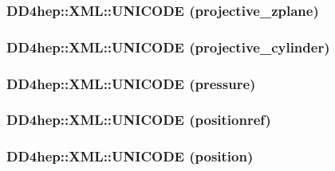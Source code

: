 \label{namespace_d_d4hep_1_1_x_m_l_a6e7b5f6dc407e16fcea4b75b29e3683e}
\hypertarget{namespace_d_d4hep_1_1_x_m_l_aa8b79772b842db484da613c5ed89043a}{
\subsubsection[{UNICODE}]{\setlength{\rightskip}{0pt plus 5cm}DD4hep::XML::UNICODE (projective\_\-zplane)}}
\label{namespace_d_d4hep_1_1_x_m_l_aa8b79772b842db484da613c5ed89043a}
\hypertarget{namespace_d_d4hep_1_1_x_m_l_ab513f7266c526cdff63d86d83ee9f4f9}{
\subsubsection[{UNICODE}]{\setlength{\rightskip}{0pt plus 5cm}DD4hep::XML::UNICODE (projective\_\-cylinder)}}
\label{namespace_d_d4hep_1_1_x_m_l_ab513f7266c526cdff63d86d83ee9f4f9}
\hypertarget{namespace_d_d4hep_1_1_x_m_l_a295c897562467a0f3d6f86644b3f8467}{
\subsubsection[{UNICODE}]{\setlength{\rightskip}{0pt plus 5cm}DD4hep::XML::UNICODE (pressure)}}
\label{namespace_d_d4hep_1_1_x_m_l_a295c897562467a0f3d6f86644b3f8467}
\hypertarget{namespace_d_d4hep_1_1_x_m_l_af46acbf8ffad8ee932b015566d09e903}{
\subsubsection[{UNICODE}]{\setlength{\rightskip}{0pt plus 5cm}DD4hep::XML::UNICODE (positionref)}}
\label{namespace_d_d4hep_1_1_x_m_l_af46acbf8ffad8ee932b015566d09e903}
\hypertarget{namespace_d_d4hep_1_1_x_m_l_ab62b0dd1c3a8ee8b922efeacab631b71}{
\subsubsection[{UNICODE}]{\setlength{\rightskip}{0pt plus 5cm}DD4hep::XML::UNICODE (position)}}
\label{namespace_d_d4hep_1_1_x_m_l_ab62b0dd1c3a8ee8b922efeacab631b71}
